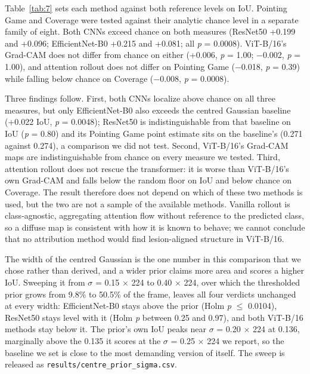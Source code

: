 \documentclass[preprint,12pt]{elsarticle}
\begin{document}
Table~\ref{tab:7} sets each method against both reference levels on IoU. Pointing Game and Coverage were tested against their analytic chance level in a separate family of eight. Both CNNs exceed chance on both measures (ResNet50 +0.199 and +0.096; EfficientNet-B0 +0.215 and +0.081; all \emph{p} = 0.0008). ViT-B/16's Grad-CAM does not differ from chance on either (+0.006, \emph{p} = 1.00; $-$0.002, \emph{p} = 1.00), and attention rollout does not differ on Pointing Game ($-$0.018, \emph{p} = 0.39) while falling below chance on Coverage ($-$0.008, \emph{p} = 0.0008).

Three findings follow. First, both CNNs localize above chance on all three measures, but only EfficientNet-B0 also exceeds the centred Gaussian baseline (+0.022 IoU, \emph{p} = 0.0048); ResNet50 is indistinguishable from that baseline on IoU (\emph{p} = 0.80) and its Pointing Game point estimate sits on the baseline's (0.271 against 0.274), a comparison we did not test. Second, ViT-B/16's Grad-CAM maps are indistinguishable from chance on every measure we tested. Third, attention rollout does not rescue the transformer: it is worse than ViT-B/16's own Grad-CAM and falls below the random floor on IoU and below chance on Coverage. The result therefore does not depend on which of these two methods is used, but the two are not a sample of the available methods. Vanilla rollout is class-agnostic, aggregating attention flow without reference to the predicted class, so a diffuse map is consistent with how it is known to behave; we cannot conclude that no attribution method would find lesion-aligned structure in ViT-B/16.

The width of the centred Gaussian is the one number in this comparison that we chose rather than derived, and a wider prior claims more area and scores a higher IoU. Sweeping it from $\sigma$ = 0.15 $\times$ 224 to 0.40 $\times$ 224, over which the thresholded prior grows from 9.8\% to 50.5\% of the frame, leaves all four verdicts unchanged at every width: EfficientNet-B0 stays above the prior (Holm \emph{p} $\leq$ 0.0104), ResNet50 stays level with it (Holm \emph{p} between 0.25 and 0.97), and both ViT-B/16 methods stay below it. The prior's own IoU peaks near $\sigma$ = 0.20 $\times$ 224 at 0.136, marginally above the 0.135 it scores at the $\sigma$ = 0.25 $\times$ 224 we report, so the baseline we set is close to the most demanding version of itself. The sweep is released as \texttt{results/centre\_prior\_sigma.csv}.
\end{document}
